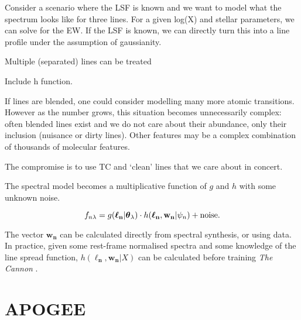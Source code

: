 \documentclass[useAMS,usenatbib]{mn2e}
\newcommand\tc{\textit{The Cannon} }
\newcommand\lv{\mathbf{\boldsymbol\ell_n}}
\newcommand\cv{{\boldsymbol\theta}_\lambda}
\newcommand\wv{\mathbf{w_n}}
\newcommand\given{|}
\begin{document}

Consider a scenario where the LSF is known and we want to model what the
spectrum looks like for three lines. For a given log(X) and stellar parameters,
we can solve for the EW. If the LSF is known, we can directly turn this into a
line profile under the assumption of gaussianity.

Multiple (separated) lines can be treated

Include h function.

If lines are blended, one could consider modelling many more atomic transitions.
However as the number grows, this situation becomes unnecessarily complex:
often blended lines exist and we do not care about their abundance, only their
inclusion (nuisance or dirty lines). Other features may be a complex combination
of thousands of molecular features.

The compromise is to use TC and `clean' lines that we care about in concert.

The spectral model becomes a multiplicative function of $g$ and $h$ with some
unknown noise.

\begin{equation}
    f_{n\lambda} = g(\lv\given\cv) \cdot h(\lv,\wv\given\psi_n) +  {\rm noise}.
\end{equation}

The vector $\wv$ can be calculated directly from spectral synthesis, or using data.
In practice, given some rest-frame normalised spectra and some knowledge of the
line spread function, $h(\lv,\wv\given{}X)$ can be calculated before training \tc.







\section{APOGEE}

\end{document}
